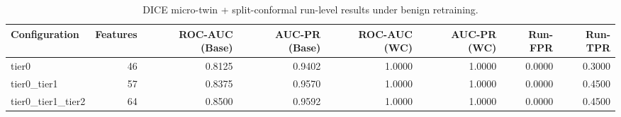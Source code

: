 \begin{table}[t]
\centering
\caption{DICE micro-twin + split-conformal run-level results under benign retraining.}
\label{tab:dice_full_overall}
\footnotesize
\begin{tabular}{lrrrrrrr}
\toprule
Configuration & Features & ROC-AUC (Base) & AUC-PR (Base) & ROC-AUC (WC) & AUC-PR (WC) & Run-FPR & Run-TPR \\
\midrule
tier0 & 46 & 0.8125 & 0.9402 & 1.0000 & 1.0000 & 0.0000 & 0.3000 \\
tier0_tier1 & 57 & 0.8375 & 0.9570 & 1.0000 & 1.0000 & 0.0000 & 0.4500 \\
tier0_tier1_tier2 & 64 & 0.8500 & 0.9592 & 1.0000 & 1.0000 & 0.0000 & 0.4500 \\
\bottomrule
\end{tabular}

\end{table}
